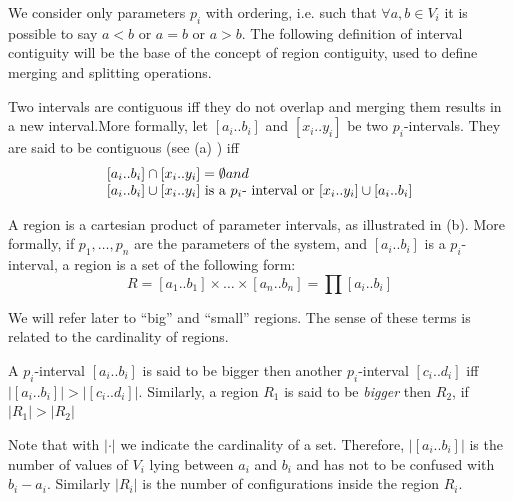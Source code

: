 We consider only parameters $p_{i}$ with ordering, i.e. such
that $\forall a,b\in V_{i}$ it is possible
to say $a<b$ or $a=b$ or $a>b$. 
The following definition of interval contiguity will be the base of the concept of region contiguity, used to define merging and splitting operations.
\begin{definition}
\label{pers02.def:Contiguous-intervals}
Two intervals are contiguous iff they do not overlap and merging them results in a new interval.More formally, let $\left[a_{i}..b_{i}\right]$ and $\left[x_{i}..y_{i}\right]$
be two $p_{i}$-intervals. They are said to be contiguous (see (a) ) iff
\begin{align}\begin{array}{l}
	\left[a_{i}..b_{i}\right]\cap\left[x_{i}..y_{i}\right]=\emptyset \mbox{      and} \\
	\left[a_{i}..b_{i}\right]\cup\left[x_{i}..y_{i}\right]$ is a $p_{i}$-
interval or $\left[x_{i}..y_{i}\right]\cup\left[a_{i}..b_{i}\right]
\end{array}\end{align}
\end{definition}

\begin{definition}[Region] 
A region is a cartesian product of parameter intervals, as illustrated in  (b). More formally, if $p_1,\dots,p_n$ are the parameters of the system, and $\left[ a_{i}..b_{i} \right]$ is a $p_i$-interval, a region is a set of the following form:
\[
R=\left[a_{1}..b_{1}\right]\times\dots\times\left[a_{n}..b_{n}\right]=\prod\left[a_{i}..b_{i}\right]
\]
\end{definition}

We will refer later to ``big'' and ``small'' regions. The sense
of these terms is related to the cardinality of regions.
\begin{definition}
A $p_{i}$-interval $\left[a_{i}..b_{i}\right]$
is said to be bigger then another $p_{i}$-interval $\left[c_{i}..d_{i}\right]$
iff 
$\left|\left[a_{i}..b_{i}\right]\right|>\left|\left[c_{i}..d_{i}\right]\right|$.
Similarly, a region $R_{1}$ is said to be \emph{bigger }then $R_{2}$, if
$\left|R_{1}\right|>\left|R_{2}\right|$
\end{definition}
Note that with $|\cdot|$ we indicate the cardinality of a set. Therefore, $\left|\left[a_{i}..b_{i}\right]\right|$ is the number of values of $V_i$ lying between $a_{i}$ and $b_{i}$ and has not to be confused with $b_i - a_i$.
Similarly $\left|R_{i}\right|$ is the number of configurations inside the region $R_i$.

